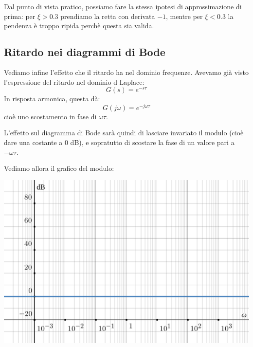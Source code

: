 \documentclass[a4paper,11pt]{article}
\begin{document}
\par\bigskip

Dal punto di vista pratico, possiamo fare la stessa ipotesi di approssimazione di prima: per $\xi > 0.3$ prendiamo la retta con derivata $-1$, mentre per $\xi < 0.3$ la pendenza è troppo ripida perchè questa sia valida.

\subsection{Ritardo nei diagrammi di Bode}
Vediamo infine l'effetto che il ritardo ha nel dominio frequenze.
Avevamo già visto l'espressione del ritardo nel dominio d Laplace:
$$
G(s) = e^{-s \tau}
$$
In risposta armonica, questa dà:
$$
G(j \omega) = e^{-j \omega \tau}
$$
cioè uno scostamento in fase di $\omega \tau$.

L'effetto sul diagramma di Bode sarà quindi di lasciare invariato il modulo (cioè dare una costante a 0 dB), e sopratutto di scostare la fase di un valore pari a $-\omega \tau$.

\par\bigskip

\noindent
\begin{minipage}{\textwidth}
Vediamo allora il grafico del modulo:

\begin{center}
	\includegraphics[scale=0.3]{../figures/delay_bode/mod.png}
\end{center}
\end{minipage}

\par\bigskip
\end{document}
